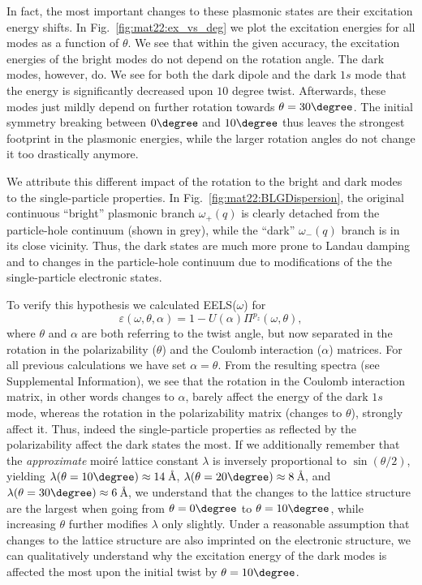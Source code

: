 
In fact, the most important changes to these plasmonic states are their excitation energy shifts. In Fig.~\ref{fig:mat22:ex_vs_deg} we plot the excitation energies for all modes as a function of $\theta$. We see that within the given accuracy, the excitation energies of the bright modes do not depend on the rotation angle. The dark modes, however, do. We see for both the dark dipole and the dark $1s$ mode that the energy is significantly decreased upon $10$ degree twist. Afterwards, these modes just mildly depend on further rotation towards $\theta=30\degree$. The initial symmetry breaking between $0\degree$ and $10\degree$ thus leaves the strongest footprint in the plasmonic energies, while the larger rotation angles do not change it too drastically anymore. 

We attribute this different impact of the rotation to the bright and dark modes to the single-particle properties. In Fig.~\ref{fig:mat22:BLGDispersion}, the original continuous ``bright'' plasmonic branch $\omega_+(q)$ is clearly detached from the particle-hole continuum (shown in grey), while the ``dark'' $\omega_-(q)$ branch is in its close vicinity. Thus, the dark states are much more prone to Landau damping and to changes in the particle-hole continuum due to modifications of the the single-particle electronic states. 

To verify this hypothesis we calculated EELS($\omega$) for
\begin{equation*}
    \varepsilon(\omega, \theta, \alpha) = 1 - U(\alpha) \Pi^{p_z}(\omega, \theta),
\end{equation*}
where $\theta$ and $\alpha$ are both referring to the twist angle, but now separated in the rotation in the polarizability ($\theta$) and the Coulomb interaction ($\alpha$) matrices. For all previous calculations we have set $\alpha = \theta$.
From the resulting spectra (see Supplemental Information), %
we see that the rotation in the Coulomb interaction matrix, in other words changes to $\alpha$, barely affect the energy of the dark $1s$ mode, whereas the rotation in the polarizability matrix (changes to $\theta$), strongly affect it.
Thus, indeed the single-particle properties as reflected by the polarizability affect the dark states the most. If we additionally remember that the \emph{approximate} moir\'{e} lattice constant $\lambda$ is inversely proportional to $\sin(\theta/2)$, yielding $\lambda(\theta=10\degree) \approx 14\,$\AA, $\lambda(\theta=20\degree) \approx 8\,$\AA, and $\lambda(\theta=30\degree) \approx 6\,$\AA, we understand that the changes to the lattice structure are the largest when going from $\theta=0\degree$ to $\theta=10\degree$, while increasing $\theta$ further modifies $\lambda$ only slightly. Under a reasonable assumption that changes to the lattice structure are also imprinted on the electronic structure, we can qualitatively understand why the excitation energy of the dark modes is affected the most upon the initial twist by $\theta=10\degree$.


